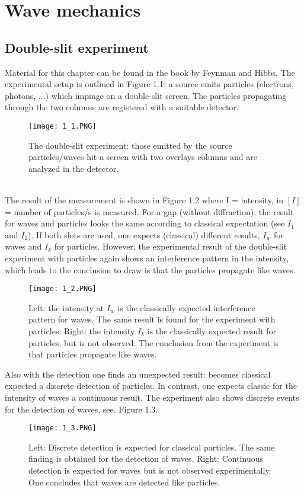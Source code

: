 \chapter{Wave mechanics}
\section{Double-slit experiment}
Material for this chapter can be found in the book by Feynman and Hibbs. The experimental setup is outlined in Figure 1.1: a source emits particles (electrons, photons, ...) which impinge on a double-slit screen. The particles propagating through the two columns are registered with a suitable detector.
\begin{figure}[ht]
    \centering
    \texttt{[image: 1\_1.PNG]}
    \caption{The double-slit experiment: those emitted by the source particles/waves hit a screen with two overlays columns and are analyzed in the detector.}
    \label{fig:1.1}
\end{figure}
\\
The result of the measurement is shown in Figure 1.2 where I = intensity, in $[I]$ = number of particles/s is measured. For a gap (without diffraction), the result for waves and particles looks the same according to classical expectation (see $I_1$ and $I_2$). If both slots are used, one expects (classical) different results, $I_w$ for waves and $I_k$ for particles. However, the experimental result of the double-slit experiment with particles again shows an interference pattern in the intensity, which leads to the conclusion
to draw is that the particles propagate like waves.
\begin{figure}[ht]
    \centering
    \texttt{[image: 1\_2.PNG]}
    \caption{Left: the intensity at $I_w$ is the classically expected interference pattern for waves. The same result is found for the experiment with particles. Right: the intensity $I_k$ is the classically expected result for particles, but is not observed. The conclusion from the experiment is that particles propagate like waves.}
    \label{fig:1.2}
\end{figure}
Also with the detection one finds an unexpected result: becomes classical expected a discrete detection of particles. In contrast, one expects
classic for the intensity of waves a continuous result. The experiment also shows discrete events for the detection of waves, see. Figure  1.3.
\begin{figure}[ht]
    \centering
    \texttt{[image: 1\_3.PNG]}
    \caption{Left: Discrete detection is expected for classical particles. The same finding is obtained for the detection of waves. Right: Continuous detection is expected for waves but is not observed experimentally. One concludes that waves are detected like particles.}
    \label{fig:1.3}
\end{figure}
